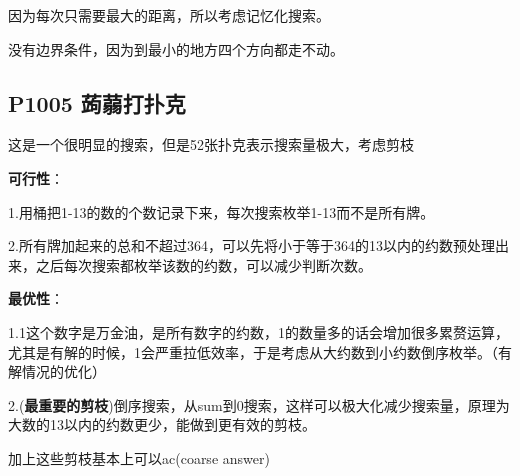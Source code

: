 \documentclass[UTF8]{ctexart}
\begin{document}
	因为每次只需要最大的距离，所以考虑记忆化搜索。
	
	没有边界条件，因为到最小的地方四个方向都走不动。
	\subsection*{P1005 蒟蒻打扑克}
	这是一个很明显的搜索，但是52张扑克表示搜索量极大，考虑剪枝
	
	\textbf{可行性}：
	
	1.用桶把1-13的数的个数记录下来，每次搜索枚举1-13而不是所有牌。
	
	2.所有牌加起来的总和不超过364，可以先将小于等于364的13以内的约数预处理出来，之后每次搜索都枚举该数的约数，可以减少判断次数。
	
	\textbf{最优性}：
	
	1.1这个数字是万金油，是所有数字的约数，1的数量多的话会增加很多累赘运算，尤其是有解的时候，1会严重拉低效率，于是考虑从大约数到小约数倒序枚举。（有解情况的优化）
	
	2.(\textbf{最重要的剪枝})倒序搜索，从sum到0搜索，这样可以极大化减少搜索量，原理为大数的13以内的约数更少，能做到更有效的剪枝。
	
	加上这些剪枝基本上可以ac(coarse answer)
\end{document}
